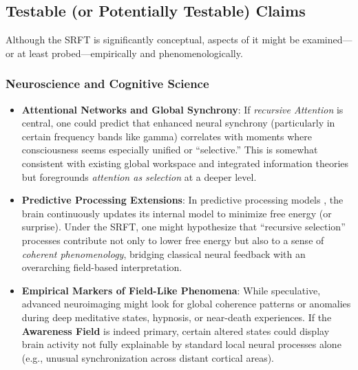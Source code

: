 \documentclass[12pt,a4paper]{article}
\begin{document}
\subsection{Testable (or Potentially Testable) Claims}
\label{subsec:testable-claims}

Although the SRFT is significantly conceptual, aspects of it might be examined---or at least probed---empirically and phenomenologically.

\subsubsection{Neuroscience and Cognitive Science}
\begin{itemize}
    \item \textbf{Attentional Networks and Global Synchrony}: 
    If \emph{recursive Attention} is central, one could predict that enhanced neural synchrony (particularly in certain frequency bands like gamma) correlates with moments where consciousness seems especially unified or “selective.” This is somewhat consistent with existing global workspace and integrated information theories but foregrounds \emph{attention as selection} at a deeper level.

    \item \textbf{Predictive Processing Extensions}: 
    In predictive processing models \cite{friston2010}, the brain continuously updates its internal model to minimize free energy (or surprise). Under the SRFT, one might hypothesize that “recursive selection” processes contribute not only to lower free energy but also to a sense of \emph{coherent phenomenology}, bridging classical neural feedback with an overarching field-based interpretation.

    \item \textbf{Empirical Markers of Field-Like Phenomena}: 
    While speculative, advanced neuroimaging might look for global coherence patterns or anomalies during deep meditative states, hypnosis, or near-death experiences. If the \textbf{Awareness Field} is indeed primary, certain altered states could display brain activity not fully explainable by standard local neural processes alone (e.g., unusual synchronization across distant cortical areas).
\end{itemize}
\end{document}
